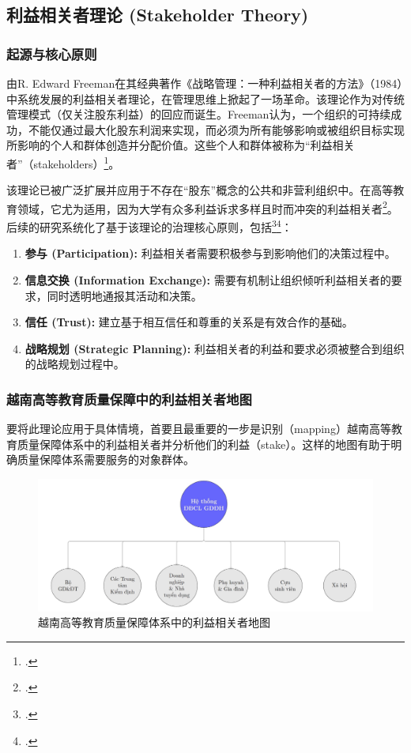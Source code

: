 \subsection{利益相关者理论 (Stakeholder Theory)}
\label{subsec:ben_lien_quan_nen_tang}

\subsubsection{起源与核心原则}

由R. Edward Freeman在其经典著作《战略管理：一种利益相关者的方法》（1984）中系统发展的利益相关者理论，在管理思维上掀起了一场革命。该理论作为对传统管理模式（仅关注股东利益）的回应而诞生。Freeman认为，一个组织的可持续成功，不能仅通过最大化股东利润来实现，而必须为所有能够影响或被组织目标实现所影响的个人和群体创造并分配价值。这些个人和群体被称为“利益相关者”（stakeholders）\footcite{Freeman1984}。

该理论已被广泛扩展并应用于不存在“股东”概念的公共和非营利组织中。在高等教育领域，它尤为适用，因为大学有众多利益诉求多样且时而冲突的利益相关者\footcite{Langrafe2020}。后续的研究系统化了基于该理论的治理核心原则，包括\footcite{LangrafeEUR2020}\footcite{IJLTER2024}：
\begin{enumerate}
    \item \textbf{参与 (Participation):} 利益相关者需要积极参与到影响他们的决策过程中。
    \item \textbf{信息交换 (Information Exchange):} 需要有机制让组织倾听利益相关者的要求，同时透明地通报其活动和决策。
    \item \textbf{信任 (Trust):} 建立基于相互信任和尊重的关系是有效合作的基础。
    \item \textbf{战略规划 (Strategic Planning):} 利益相关者的利益和要求必须被整合到组织的战略规划过程中。
\end{enumerate}

\subsubsection{越南高等教育质量保障中的利益相关者地图}

要将此理论应用于具体情境，首要且最重要的一步是识别（mapping）越南高等教育质量保障体系中的利益相关者并分析他们的利益（stake）。这样的地图有助于明确质量保障体系需要服务的对象群体。
\begin{figure}[h!]
    \centering
    \includegraphics[width=\textwidth]{image/stakeholder_map.jpg} 
    \caption{越南高等教育质量保障体系中的利益相关者地图}
    \label{fig:stakeholder-map}
\end{figure}


